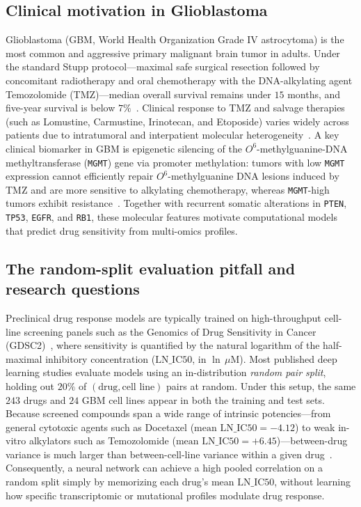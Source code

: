\documentclass{article}
\begin{document}
\subsection{Clinical motivation in Glioblastoma}
Glioblastoma (GBM, World Health Organization Grade IV astrocytoma) is the most common and aggressive primary malignant brain tumor in adults. Under the standard Stupp protocol---maximal safe surgical resection followed by concomitant radiotherapy and oral chemotherapy with the DNA-alkylating agent Temozolomide (TMZ)---median overall survival remains under $15$ months, and five-year survival is below $7\%$~\cite{stupp2005radiotherapy}. Clinical response to TMZ and salvage therapies (such as Lomustine, Carmustine, Irinotecan, and Etoposide) varies widely across patients due to intratumoral and interpatient molecular heterogeneity~\cite{brennan2013somatic}. A key clinical biomarker in GBM is epigenetic silencing of the $O^6$-methylguanine-DNA methyltransferase (\texttt{MGMT}) gene via promoter methylation: tumors with low \texttt{MGMT} expression cannot efficiently repair $O^6$-methylguanine DNA lesions induced by TMZ and are more sensitive to alkylating chemotherapy, whereas \texttt{MGMT}-high tumors exhibit resistance~\cite{hegi2005mgmt}. Together with recurrent somatic alterations in \texttt{PTEN}, \texttt{TP53}, \texttt{EGFR}, and \texttt{RB1}, these molecular features motivate computational models that predict drug sensitivity from multi-omics profiles.

\subsection{The random-split evaluation pitfall and research questions}
Preclinical drug response models are typically trained on high-throughput cell-line screening panels such as the Genomics of Drug Sensitivity in Cancer (GDSC2)~\cite{yang2013gdsc,iorio2016landscape}, where sensitivity is quantified by the natural logarithm of the half-maximal inhibitory concentration ($\text{LN\_IC50}$, in $\ln\,\mu\text{M}$). Most published deep learning studies evaluate models using an in-distribution \emph{random pair split}, holding out $20\%$ of $(\text{drug}, \text{cell line})$ pairs at random. Under this setup, the same $243$ drugs and $24$ GBM cell lines appear in both the training and test sets. Because screened compounds span a wide range of intrinsic potencies---from general cytotoxic agents such as Docetaxel ($\text{mean LN\_IC50} = -4.12$) to weak in-vitro alkylators such as Temozolomide ($\text{mean LN\_IC50} = +6.45$)---between-drug variance is much larger than between-cell-line variance within a given drug~\cite{li2021audit}. Consequently, a neural network can achieve a high pooled correlation on a random split simply by memorizing each drug's mean $\text{LN\_IC50}$, without learning how specific transcriptomic or mutational profiles modulate drug response.
\end{document}
